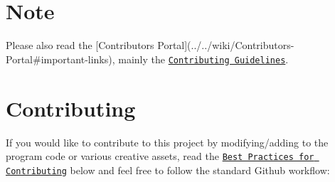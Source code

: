 \section*{Note}

Please also read the \mbox{[}Contributor\textquotesingle{}s Portal\mbox{]}(../../wiki/\+Contributors\textquotesingle{}-\/\+Portal\#important-\/links), mainly the \href{../../wiki/Contributing-Guidelines}{\tt Contributing Guidelines}.

\section*{Contributing}

If you would like to contribute to this project by modifying/adding to the program code or various creative assets, read the \href{#best-practices-for-contributing}{\tt Best Practices for Contributing} below and feel free to follow the standard Github workflow\+:


